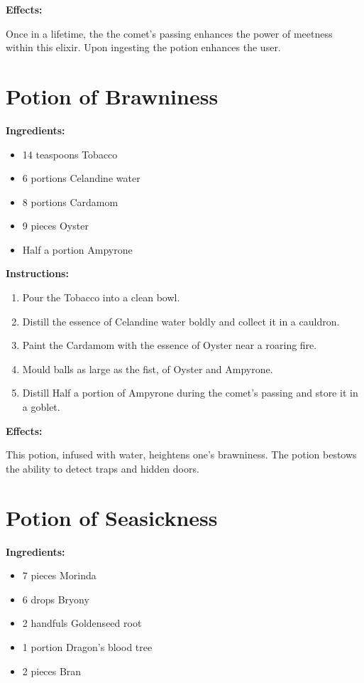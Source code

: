 \documentclass{article}
\begin{document}
\textbf{Effects:}

Once in a lifetime, the the comet’s passing enhances the power of meetness within this elixir. Upon ingesting the potion enhances the user.

\newpage
\section*{Potion of Brawniness}

\textbf{Ingredients:}

\begin{itemize}
  \item 14 teaspoons Tobacco
  \item 6 portions Celandine water
  \item 8 portions Cardamom
  \item 9 pieces Oyster
  \item Half a portion Ampyrone
\end{itemize}

\textbf{Instructions:}

\begin{enumerate}
  \item Pour the Tobacco into a clean bowl.
  \item Distill the essence of Celandine water boldly and collect it in a cauldron.
  \item Paint the Cardamom with the essence of Oyster near a roaring fire.
  \item Mould balls as large as the fist, of Oyster and Ampyrone.
  \item Distill Half a portion of Ampyrone during the comet’s passing and store it in a goblet.
\end{enumerate}

\textbf{Effects:}

This potion, infused with water, heightens one's brawniness. The potion bestows the ability to detect traps and hidden doors.

\newpage
\section*{Potion of Seasickness}

\textbf{Ingredients:}

\begin{itemize}
  \item 7 pieces Morinda
  \item 6 drops Bryony
  \item 2 handfuls Goldenseed root
  \item 1 portion Dragon's blood tree
  \item 2 pieces Bran
\end{itemize}
\end{document}
